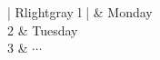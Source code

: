 \documentclass{article}
\begin{document}
\begin{table}
	\centering
	\begin{tabular}{| R{lightgray} l |}
		 & Monday \\
		2 & Tuesday \\
		3 & $\cdots$ \\
		\hline
	\end{tabular}
	\caption{Weekdays}
\end{table}
\end{document}
